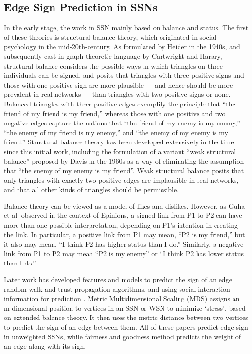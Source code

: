 \documentclass{article}
\begin{document}
\subsection{Edge Sign Prediction in SSNs}
In the early stage, the work in
SSN mainly based on balance and status. The first of these 
theories is structural balance theory, which originated in 
social psychology in the mid-20th-century. As formulated by 
Heider in the 1940s\cite{heider1940}, and subsequently cast 
in graph-theoretic language by Cartwright and 
Harary\cite{Cartwright1956-CARSBA-4}, structural balance 
considers the possible ways in which triangles on three 
individuals can be signed, and posits that triangles with 
three positive signs and those with one positive sign are 
more plausible — and hence should be more prevalent in real 
networks — than triangles with two positive signs or none. 
Balanced triangles with three positive edges exemplify the 
principle that “the friend of my friend is my friend,” whereas 
those with one positive and two negative edges capture the 
notions that “the friend of my enemy is my enemy,” 
“the enemy of my friend is my enemy,” and 
“the enemy of my enemy is my friend.” 
Structural balance theory has been developed extensively 
in the time since this initial work\cite{wasserman1994social}, 
including the formulation of a variant “weak structural balance” 
proposed by Davis in the 1960s \cite{Davis1967}as a way of 
eliminating the assumption that “the enemy of my enemy is my 
friend”. Weak structural balance posits that only triangles 
with exactly two positive edges are implausible in real 
networks, and that all other kinds of triangles should be 
permissible.

Balance theory can be viewed as a model of likes and dislikes. 
However, as Guha et al. observed in the context of 
Epinions\cite{Guha:2004:PTD:988672.988727}, a signed link from 
P1 to P2 can have more than one possible interpretation, 
depending on P1’s intention in creating the link. 
In particular, a positive link from P1 may mean, 
“P2 is my friend,” but it also may mean, “I think P2 has higher 
status than I do.” Similarly, a negative link from P1 to P2 may
 mean “P2 is my enemy” or “I think P2 has lower status than 
 I do.”

Later work has developed features and models to predict the 
sign of an edge random-walk and trust-propagation 
algorithms\cite{Dubois}\cite{Guha:2004:PTD:988672.988727}, 
and using social interaction information for prediction
\cite{Yang2012}\cite{Tang:2016:SSN:2988524.2956185}. Metric 
Multidimensional Scaling (MDS) assigns an m-dimensional 
position to vertices in an SSN or WSN to minimize ‘stress’, 
based on extended balance theory\cite{Qian:2014:FTD:2639948.2628438}. 
It then uses the metric distance between two vertices to 
predict the sign of an edge between them. All of these papers 
predict edge sign in unweighted SSNs, while fairness and 
goodness method predicts the weight of an edge along with its 
sign. 
\end{document}
